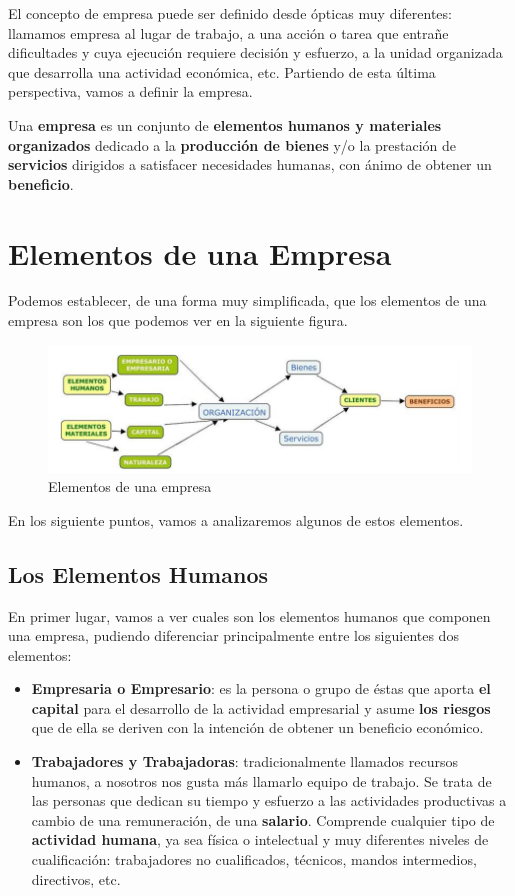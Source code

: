 El concepto de empresa puede ser definido desde ópticas muy diferentes: llamamos empresa al lugar de trabajo, a una acción o tarea que entrañe dificultades y cuya ejecución requiere decisión y esfuerzo, a la unidad organizada que desarrolla una actividad económica, etc. Partiendo de esta última perspectiva, vamos a definir la empresa.

Una \textbf{empresa} es un conjunto de \textbf{elementos humanos y materiales organizados} dedicado a la \textbf{producción de bienes} y/o la prestación de \textbf{servicios} dirigidos a satisfacer necesidades humanas, con ánimo de obtener un \textbf{beneficio}.

\section{Elementos de una Empresa}
Podemos establecer, de una forma muy simplificada, que los elementos de una empresa son los que podemos ver en la siguiente figura.

\begin{figure}[H]
    \centering
    \includegraphics[scale=0.50]{elementos-empresa.png}
    \caption{Elementos de una empresa}
\end{figure}

En los siguiente puntos, vamos a analizaremos algunos de estos elementos.

\subsection{Los Elementos Humanos}
En primer lugar, vamos a ver cuales son los elementos humanos que componen una empresa, pudiendo diferenciar principalmente entre los siguientes dos elementos:

\begin{itemize}
    \item \textbf{Empresaria o Empresario}: es la persona o grupo de éstas que aporta \textbf{el capital} para el desarrollo de la actividad empresarial y asume \textbf{los riesgos} que de ella se deriven con la intención de obtener un beneficio económico.

    \item \textbf{Trabajadores y Trabajadoras}: tradicionalmente llamados recursos humanos, a nosotros nos gusta más llamarlo equipo de trabajo. Se trata de las personas que dedican su tiempo y esfuerzo a las actividades productivas a cambio de una remuneración, de una \textbf{salario}. Comprende cualquier tipo de \textbf{actividad humana}, ya sea física o intelectual y muy diferentes niveles de cualificación: trabajadores no cualificados, técnicos, mandos intermedios, directivos, etc.
\end{itemize}

